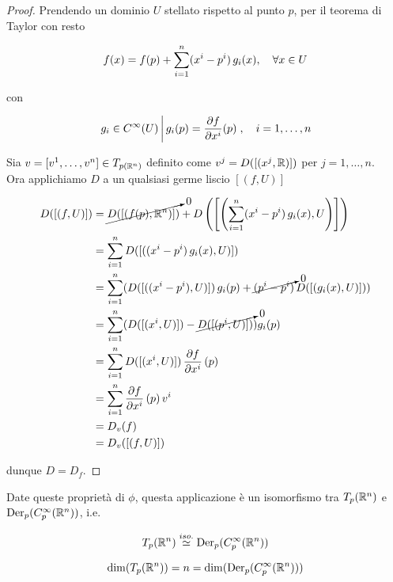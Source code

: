\begin{proof}
	Prendendo un dominio $ U $ stellato rispetto al punto $ p $, per il teorema di Taylor con resto
	
	\begin{equation}
		f(x) = f(p) + \sum_{i=1}^{n} (x^{i}-p^{i}) \, g_{i}(x) \qcomma \forall x \in U
	\end{equation}

	con
	
	\begin{equation}
		\left. g_{i} \in C^{\infty}(U) \, \middle| \, g_{i}(p) = \dfrac{\partial f}{\partial x^{i}} (p) \right., \quad i=1,\dots,n
	\end{equation}

	Sia $ v = [v^{1},\dots,v^{n}] \in T_{p (\mathbb{R}^{n})} $ definito come $ v^{j} = D([(x^{j},\mathbb{R})]) $ per $ j=1,\dots,n $.\\
	Ora applichiamo $ D $ a un qualsiasi germe liscio $ [(f,U)] $
	
	\begin{align}
		\begin{split}
			D ([(f,U)]) &= \cancelto{0}{D ([(f(p),\mathbb{R}^{n})])} + D \left(\left[\left( \sum_{i=1}^{n} (x^{i}-p^{i}) \, g_{i}(x) , U \right)\right]\right)\\
			&= \sum_{i=1}^{n} D ([( (x^{i}-p^{i}) \, g_{i}(x) , U )])\\
			&= \sum_{i=1}^{n} ( D ([( (x^{i}-p^{i}), U )]) \, g_{i}(p) + \cancelto{0}{(p^{i}-p^{i})} \, D ([( g_{i}(x), U )]) )\\
			&= \sum_{i=1}^{n} ( D ([( x^{i}, U )]) - \cancelto{0}{D ([( p^{i}, U )])} ) g_{i}(p)\\
			&= \sum_{i=1}^{n} D ([( x^{i}, U )]) \, \pdv{f}{x^{i}} \, (p)\\
			&= \sum_{i=1}^{n} \pdv{f}{x^{i}} \, (p) \, v^{i}\\
			&= D_{v} (f)\\
			&= D_{v} ([(f,U)])
		\end{split}
	\end{align}

	dunque $ D = D_{f} $.
\end{proof}

Date queste proprietà di $ \phi $, questa applicazione è un isomorfismo tra $ T_{p}(\mathbb{R}^{n}) $ e $ \operatorname{Der}_{p}(C_{p}^{\infty}(\mathbb{R}^{n})) $, i.e.

\begin{equation}
	T_{p}(\mathbb{R}^{n}) \stackrel{iso.}{\simeq} \operatorname{Der}_{p}(C_{p}^{\infty}(\mathbb{R}^{n}))
\end{equation}

\begin{corollary}
	\begin{equation}
		\dim ( T_{p}(\mathbb{R}^{n}) ) = n = \dim ( \operatorname{Der}_{p}(C_{p}^{\infty}(\mathbb{R}^{n})) )
	\end{equation}
\end{corollary}

